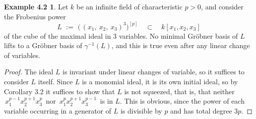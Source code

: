 \documentclass{proc-l}
\theoremstyle{plain}
\theoremstyle{definition}
\newtheorem*{definition2}{Example 4.2}
\begin{document}
\begin{definition2} Let $k$ be an infinite field of 
characteristic $p>0$, and consider the Frobenius power 
\begin{equation*}L \,\,:= \,\,\bigl ( \,(x_{1},\ x_{2},\ x_{3})^{3} \bigr )^{[p]}
\quad \subset \quad k[x_{1},x_{2},x_{3}]
\end{equation*} 
of the cube of the maximal ideal in $3$ variables.
No minimal Gr\"{o}bner basis of $L$ lifts to a Gr\"{o}bner basis
of $\gamma ^{-1}(L)$, and this is true even after any linear
change of variables.
\end{definition2}


\begin{proof} The ideal $L$ is invariant under linear changes of 
variable, so it suffices to consider $L$ itself.
Since $L$ is a monomial ideal, it is its own initial ideal,
so by Corollary 3.2 it suffices to show that $L$ is not squeezed,
that is, that neither
$\, x_{1}^{p-1} x_{2}^{p+1} x_{3}^{p}\,$ nor $\,x_{1}^{p} x_{2}^{p+1} x_{3}^{p-1} \,$ 
is in $L$. This is obvious, since the power of each variable 
occurring in a generator of $L$ is divisible by $p$ and has total
degree $3p$.
\end{proof}
\end{document}
